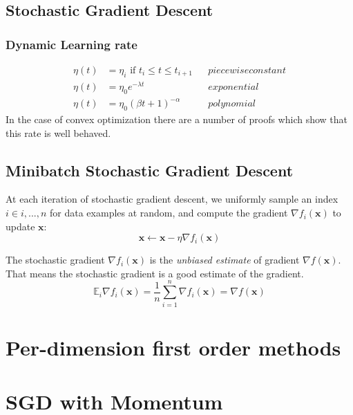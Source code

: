 \subsection{Stochastic Gradient Descent}
\subsubsection{Dynamic Learning rate}

\begin{equation}
    \begin{aligned}
        \eta(t) &= \eta_i \text{ if } t_i \leq  t \leq t_{i+1} & & piecewise constant\\
        \eta(t) &= \eta_0 e^{-\lambda t} & & exponential\\
        \eta(t) &= \eta_0 (\beta t + 1) ^{-\alpha} && polynomial
    \end{aligned}
\end{equation}
In the case of convex optimization there are a number of proofs which show that this rate is well behaved.

\subsection{Minibatch Stochastic Gradient Descent}
At each iteration of stochastic gradient descent, we uniformly sample an index $i \in {i,..., n}$ for data examples at
random, and compute the gradient $\nabla f_i(\mathbf{x})$ to update $\mathbf{x}$:
\begin{equation}
    \mathbf{x} \leftarrow \mathbf{x} - \eta \nabla f_i(\mathbf{x})
\end{equation}

The stochastic gradient $\nabla f_i(\mathbf{x})$ is the \textit{unbiased estimate} of gradient $\nabla f(\mathbf{x})$. 
That means the stochastic gradient is a good estimate of the gradient.
\begin{equation}
    \mathbb{E}_i \nabla f_i(\mathbf{x}) = \frac{1}{n} \sum_{i=1}^n \nabla f_i (\mathbf{x}) = \nabla f(\mathbf{x})
\end{equation}

\section{Per-dimension first order methods}

\section{SGD with Momentum}


